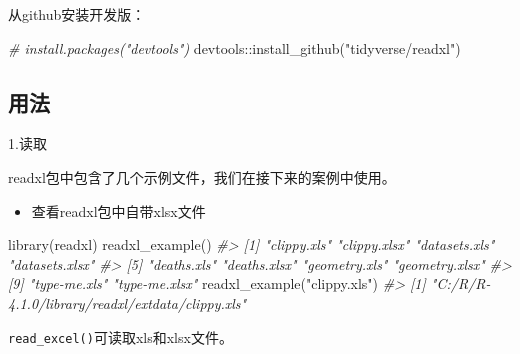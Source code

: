 \documentclass[
]{book}
\newenvironment{Shaded}{\begin{snugshade}}{\end{snugshade}}
\newcommand{\CommentTok}[1]{\textcolor[rgb]{0.56,0.35,0.01}{\textit{#1}}}
\newcommand{\FunctionTok}[1]{\textcolor[rgb]{0.00,0.00,0.00}{#1}}
\newcommand{\NormalTok}[1]{#1}
\newcommand{\SpecialCharTok}[1]{\textcolor[rgb]{0.00,0.00,0.00}{#1}}
\newcommand{\StringTok}[1]{\textcolor[rgb]{0.31,0.60,0.02}{#1}}
\providecommand{\tightlist}{%
  \setlength{\itemsep}{0pt}\setlength{\parskip}{0pt}}
\begin{document}
从github安装开发版：

\begin{Shaded}
\begin{Highlighting}[]
\CommentTok{\# install.packages("devtools")}
\NormalTok{devtools}\SpecialCharTok{::}\FunctionTok{install\_github}\NormalTok{(}\StringTok{"tidyverse/readxl"}\NormalTok{)}
\end{Highlighting}
\end{Shaded}

\hypertarget{readxl:usage}{%
\subsection{用法}\label{readxl:usage}}

1.读取

readxl包中包含了几个示例文件，我们在接下来的案例中使用。

\begin{itemize}
\tightlist
\item
  查看readxl包中自带xlsx文件
\end{itemize}

\begin{Shaded}
\begin{Highlighting}[]
\FunctionTok{library}\NormalTok{(readxl)}
\FunctionTok{readxl\_example}\NormalTok{()}
\CommentTok{\#\textgreater{}  [1] "clippy.xls"    "clippy.xlsx"   "datasets.xls"  "datasets.xlsx"}
\CommentTok{\#\textgreater{}  [5] "deaths.xls"    "deaths.xlsx"   "geometry.xls"  "geometry.xlsx"}
\CommentTok{\#\textgreater{}  [9] "type{-}me.xls"   "type{-}me.xlsx"}
\FunctionTok{readxl\_example}\NormalTok{(}\StringTok{"clippy.xls"}\NormalTok{)}
\CommentTok{\#\textgreater{} [1] "C:/R/R{-}4.1.0/library/readxl/extdata/clippy.xls"}
\end{Highlighting}
\end{Shaded}

\texttt{read\_excel()}可读取xls和xlsx文件。
\end{document}

